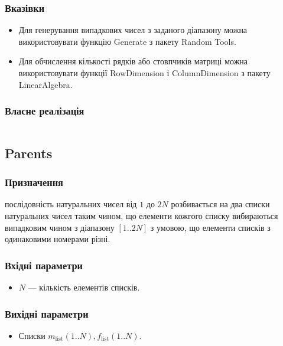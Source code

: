 \documentclass[a4paper, 12pt]{article}
\numberwithin{equation}{section}
\begin{document}
\subsubsection*{Вказівки}

\begin{itemize}
    \item Для генерування випадкових чисел з заданого діапазону можна використовувати функцію Generate з пакету Random Tools.
    \item Для обчислення кількості рядків або стовпчиків матриці можна використовувати функції RowDimension і ColumnDimension з пакету LinearAlgebra.
\end{itemize}

\subsubsection*{Власне реалізація}

\inputminted[firstline=5, lastline=30]{python}{../code/crossover.py}

\subsection{Parents}

\subsubsection*{Призначення}

послідовність натуральних чисел від $1$ до $2N$ розбивається на два списки натуральних чисел таким чином, що елементи кожгого списку вибираються випадковим чином з діапазону $[1..2N]$ з умовою, що елементи списків з одинаковими номерами різні.

\subsubsection*{Вхідні параметри}

\begin{itemize}
    \item $N$ --- кількість елементів списків.
\end{itemize}

\subsubsection*{Вихідні параметри}

\begin{itemize}
    \item Списки $m_{\text{list}}(1..N), f_{\text{list}}(1..N)$.
\end{itemize}
\end{document}

